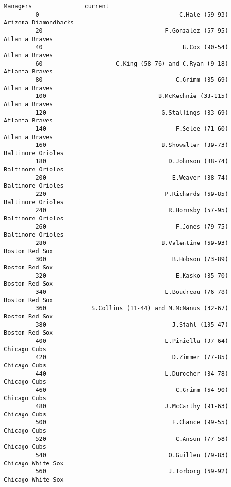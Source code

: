 \documentclass[11pt]{article}
\begin{document}
\begin{Verbatim}[commandchars=\\\{\}]
                                                        Managers               current  
         0                                        C.Hale (69-93)  Arizona Diamondbacks  
         20                                   F.Gonzalez (67-95)        Atlanta Braves  
         40                                        B.Cox (90-54)        Atlanta Braves  
         60                     C.King (58-76) and C.Ryan (9-18)        Atlanta Braves  
         80                                      C.Grimm (85-69)        Atlanta Braves  
         100                                B.McKechnie (38-115)        Atlanta Braves  
         120                                 G.Stallings (83-69)        Atlanta Braves  
         140                                     F.Selee (71-60)        Atlanta Braves  
         160                                 B.Showalter (89-73)     Baltimore Orioles  
         180                                   D.Johnson (88-74)     Baltimore Orioles  
         200                                    E.Weaver (88-74)     Baltimore Orioles  
         220                                  P.Richards (69-85)     Baltimore Orioles  
         240                                   R.Hornsby (57-95)     Baltimore Orioles  
         260                                     F.Jones (79-75)     Baltimore Orioles  
         280                                 B.Valentine (69-93)        Boston Red Sox  
         300                                    B.Hobson (73-89)        Boston Red Sox  
         320                                     E.Kasko (85-70)        Boston Red Sox  
         340                                  L.Boudreau (76-78)        Boston Red Sox  
         360             S.Collins (11-44) and M.McManus (32-67)        Boston Red Sox  
         380                                    J.Stahl (105-47)        Boston Red Sox  
         400                                  L.Piniella (97-64)          Chicago Cubs  
         420                                    D.Zimmer (77-85)          Chicago Cubs  
         440                                  L.Durocher (84-78)          Chicago Cubs  
         460                                     C.Grimm (64-90)          Chicago Cubs  
         480                                  J.McCarthy (91-63)          Chicago Cubs  
         500                                    F.Chance (99-55)          Chicago Cubs  
         520                                     C.Anson (77-58)          Chicago Cubs  
         540                                   O.Guillen (79-83)     Chicago White Sox  
         560                                   J.Torborg (69-92)     Chicago White Sox  

\end{Verbatim}
\end{document}
